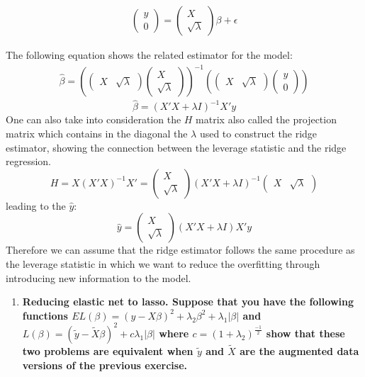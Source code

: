 \documentclass[12pt,onecolumn]{article}
\begin{document}
\begin{gather}
    \begin{pmatrix}
        y \\
        0
    \end{pmatrix} =
   \begin{pmatrix}
       X \\
       \sqrt{\lambda}
   \end{pmatrix}\beta+\epsilon
\end{gather}

The following equation shows the related estimator for the model:
\begin{gather}
    \hat{\beta}=\left(\begin{pmatrix}
        X&\sqrt{\lambda}
    \end{pmatrix}\begin{pmatrix}
        X \\ \sqrt{\lambda}
    \end{pmatrix}\right)^{-1}
    \left(\begin{pmatrix}
        X & \sqrt{\lambda}
    \end{pmatrix}\begin{pmatrix}
        y \\ 0
    \end{pmatrix}\right)
\end{gather}
\begin{equation*}
    \hat{\beta}=(X'X+\lambda{I})^{-1}X'y
\end{equation*}
One can also take into consideration the $H$ matrix also called the projection matrix which contains in the diagonal the $\lambda$ used to construct the ridge estimator, showing the connection between the leverage statistic and the ridge regression.
\begin{equation*}
    H=X(X'X)^{-1}X'=\begin{pmatrix}
        X \\ \sqrt{\lambda}
    \end{pmatrix}(X'X+\lambda{I})^{-1}\begin{pmatrix}
        X & \sqrt{\lambda}
    \end{pmatrix}
\end{equation*}
leading to the $\hat{y}$:
\begin{equation*}
    \hat{y}=\begin{pmatrix}
        X \\ \sqrt{\lambda}
    \end{pmatrix}(X'X+\lambda{I})X'y
\end{equation*}
Therefore we can assume that the ridge estimator follows the same procedure as the leverage statistic in which we want to reduce the overfitting through introducing new information to the model.
\begin{enumerate}[resume]    
    \item \bf{Reducing elastic net to lasso. Suppose that you have the following functions $EL(\beta) = (y-X\beta)^2+ \lambda_2 \beta^2+ \lambda_1|\beta|$ and $L(\beta) = (\tilde{y}-\tilde{X}\beta)^2+ c \lambda_1|\beta|$ where $c=(1+\lambda_2)^{\frac{-1}{2}}$ show that these two problems are equivalent when $\tilde{y}$ and $\tilde{X}$ are the augmented data versions of the previous exercise.}
\end{enumerate}
\end{document}
